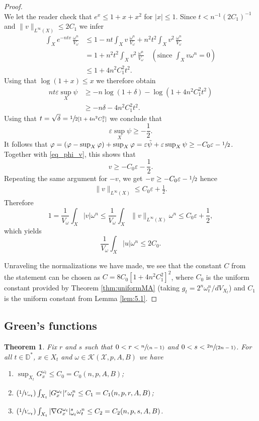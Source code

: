 \documentclass[10pt]{amsart}
\newcommand{\Psfrac}[2]{(\sfrac{#1}{#2})}
\newcommand{\spfrac}[2]{\sfrac{#1}{(#2)}}
\newtheorem{theorem}{Theorem}[section]
\theoremstyle{definition}
\newcommand{\D}{\mathbb D}
\let\Subsection\subsection\let\Subsubsection\subsubsection
\begin{document}
\begin{proof}
\[\]
We let the reader check that $e^x \leq 1+x+x^2$ for $|x| \leq 1$.
Since $t<n^{-1}(2C_1)^{-1}$ and $\|v\|_{L^{\infty}(X)} \leq 2C_1$ we infer
\begin{align*}
\int_X e^{-ntv}\,\frac{\omega^n}{V_\omega}&\leq 1- nt\int_X v\,\frac{\omega^n}{V_\omega} + n^2 t^2\int_X v^2\,\frac{\omega^n}{V_\omega}\\
&= 1+ n^2 t^2\int_X v^2\,\frac{\omega^n}{V_\omega} \quad (\text{since } \int_X v\omega^n=0) \\
&\leq 1+ 4n^2 C_1^2 t^2.
\end{align*}
Using that $\log(1+x) \leq x$ we therefore obtain
\begin{align*}
nt\varepsilon \sup_X \psi &\geq - n\log(1+\delta)- \log \left(1+4n^2C_1^2 t^2 \right)\\
&\geq - n \delta -4n^2 C_1^2 t^2.
\end{align*}
Using that $t= \sqrt{\delta}=\sfrac{1}{2[1+4n^2C_1^2]}$ we conclude that
\[
\varepsilon \sup_X \psi \geq -\frac{1}{2}.
\]
It follows that
$ \varphi= (\varphi -\sup_X \varphi)+ \sup_X \varphi = \varepsilon \tilde{\psi}+ \varepsilon \sup_X \psi
\geq -C_0 \varepsilon -\sfrac{1}{2}$.
Together with \eqref{eq_phi_v}, this shows that
\[
v\geq - C_0 \varepsilon - \frac{1}{2}.
\]
Repeating the same argument for $-v$, we get $-v\geq - C_0\varepsilon - \sfrac{1}{2}$ hence
\begin{align*}
\|v\|_{L^\infty(X)}\leq C_0 \varepsilon+ \frac{1}{2}.
\end{align*}
Therefore
\[
1=\frac{1}{V_\omega}\int_X |v|\omega^n\leq \frac{1}{V_\omega}\int_X \|v\|_{L^\infty(X)}\omega^n \leq C_0 \varepsilon+ \frac{1}{2},
\]
which yields
\[
\frac{1}{V_\omega} \int_X |u|\omega^n \leq 2 C_0.
\]

Unraveling the normalizations we have made, we see that the constant $C$ from the statement can be chosen as
$C=8C_0[1+4n^2C_1^2]^2$, where $C_0$ is the uniform constant provided by Theorem \ref{thm:uniformMA}
(taking $g_t=2^n \omega_t^n/dV_{X_t}$)
and $C_1$ is the uniform constant from Lemma \ref{lem:5.1}.
\end{proof}

\Subsection{Green's functions} \label{sec:green}

\begin{theorem} \label{thm:Green1}
Fix $r$ and $s$ such that $0<r<\spfrac{n}{n-1}$ and $0<s< \spfrac{2n}{2n-1}$.
For all $t \in \D^*$, $x \in X_t$ and $\omega \in {\mathcal K}(\mathcal{X},p,A,B)$ we have
\begin{enumerate}
\item\label{thm:Green11} $\sup_{X_t} G^{\omega_t}_x \leq C_0=C_0(n,p,A,B)$;

\item\label{thm:Green12} $\Psfrac{1}{V_{\omega_t}} \int_{X_t} |G^{\omega_t}_x|^r \omega_t^n \leq C_1=C_1(n,p,r,A,B)$;

\item\label{thm:Green13} $\Psfrac{1}{V_{\omega_t}} \int_{X_t} |\nabla G^{\omega_t}_x|_{\omega_t}^s \omega_t^n \leq C_2=C_2(n,p,s,A,B)$.
\end{enumerate}
\end{theorem}
\end{document}
